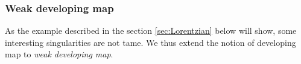 % 
% 

\subsubsection{Weak developing map}
As the example described in the section \ref{sec:Lorentzian} below will show, some interesting singularities are not tame. We thus extend the notion of developing map to {\it weak developing map}.  

